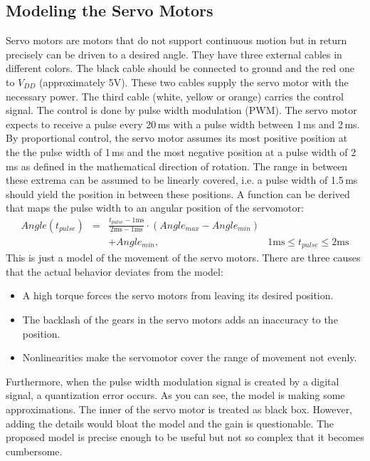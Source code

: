\documentclass{sig-alternate-05-2015}
\begin{document}
\subsection{Modeling the Servo Motors}
Servo motors are motors that do not support continuous motion but in return precisely can be driven to a desired angle. They have three external cables in different colors. The black cable should be connected to ground and the red one to $V_{DD}$ (approximately 5V). These two cables supply the servo motor with the necessary power. The third cable (white, yellow or orange) carries the control signal. The control is done by pulse width modulation (PWM). The servo motor expects to receive a pulse every 20\,ms with a pulse width between 1\,ms and 2\,ms. By proportional control, the servo motor assumes its most positive position at the the pulse width of 1\,ms and the most negative position at a pulse width of 2\,ms as defined in the mathematical direction of rotation. The range in between these extrema can be assumed to be linearly covered, i.e. a pulse width of 1.5\,ms should yield the position in between these positions. A function can be derived that maps the pulse width to an angular position of the servomotor:
\begin{eqnarray}
Angle(t_{pulse}) &=& \frac{t_{pulse} -1 \text{ms} }{2 \text{ms}-1 \text{ms}}\cdot \left(Angle_{max}-Angle_{min}\right)&\nonumber \\ &&+Angle_{min},&1 \text{ms} \le t_{pulse}\le 2 \text{ms}  \nonumber
\end{eqnarray}
This is just a model of the movement of the servo motors. There are three causes that the actual behavior deviates from the model:
\begin{itemize}
	\item A high torque forces the servo motors from leaving its desired position.
	\item The backlash of the gears in the servo motors adds an inaccuracy to the position.
	\item Nonlinearities make the servomotor cover the range of movement not evenly.
\end{itemize}
Furthermore, when the pulse width modulation signal is created by a digital signal, a quantization error occurs.
As you can see, the model is making some approximations. The inner of the servo motor is treated as black box. However, adding the details would bloat the model and the gain is questionable. The proposed model is precise enough to be useful but not so complex that it becomes cumbersome.
\end{document}
